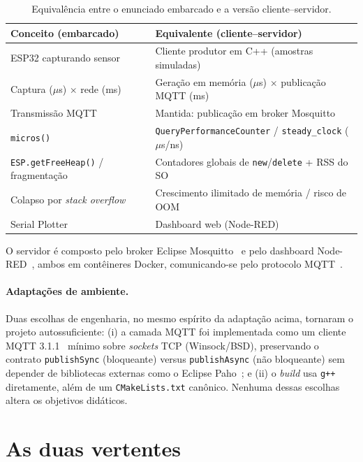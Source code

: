 \documentclass[11pt,a4paper]{article}
\begin{document}
\begin{table}[h]
\centering
\caption{Equivalência entre o enunciado embarcado e a versão cliente--servidor.}
\label{tab:equiv}
\small
\begin{tabular}{@{}ll@{}}
\toprule
\textbf{Conceito (embarcado)} & \textbf{Equivalente (cliente--servidor)} \\
\midrule
ESP32 capturando sensor & Cliente produtor em C++ (amostras simuladas) \\
Captura ($\mu$s) $\times$ rede (ms) & Geração em memória ($\mu$s) $\times$ publicação MQTT (ms) \\
Transmissão MQTT & Mantida: publicação em broker Mosquitto \\
\texttt{micros()} & \texttt{QueryPerformanceCounter} / \texttt{steady\_clock} ($\mu$s/ns) \\
\texttt{ESP.getFreeHeap()} / fragmentação & Contadores globais de \texttt{new}/\texttt{delete} + RSS do SO \\
Colapso por \emph{stack overflow} & Crescimento ilimitado de memória / risco de OOM \\
Serial Plotter & Dashboard web (Node-RED) \\
\bottomrule
\end{tabular}
\end{table}

O servidor é composto pelo broker Eclipse Mosquitto~\cite{mosquitto} e pelo
dashboard Node-RED~\cite{nodered}, ambos em contêineres Docker, comunicando-se
pelo protocolo MQTT~\cite{mqtt311}.

\paragraph{Adaptações de ambiente.} Duas escolhas de engenharia, no mesmo espírito
da adaptação acima, tornaram o projeto autossuficiente: (i) a camada MQTT foi
implementada como um cliente MQTT 3.1.1~\cite{mqtt311} mínimo sobre \emph{sockets}
TCP (Winsock/BSD), preservando o contrato \texttt{publishSync} (bloqueante) versus
\texttt{publishAsync} (não bloqueante) sem depender de bibliotecas externas como o
Eclipse Paho~\cite{paho}; e (ii) o \emph{build} usa \texttt{g++} diretamente, além
de um \texttt{CMakeLists.txt} canônico. Nenhuma dessas escolhas altera os objetivos
didáticos.

\section{As duas vertentes}
\end{document}
